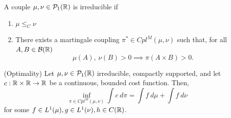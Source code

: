 \documentclass[../main.tex]{subfiles}
\begin{document}
\begin{definition}
    A couple $\mu, \nu\in\mathcal{P}_1(\mathbb{R})$ is irreducible if 
    \begin{enumerate}
        \item $\mu\leq_C\nu$
        \item There exists a martingale coupling $\pi^*\in Cpl^M(\mu, \nu)$ such that, for all $A, B\in\mathcal{B}(\mathbb{R})$ 
        $$\mu(A), \ \nu(B)>0 \implies \pi(A\times B)>0.$$
    \end{enumerate}
\end{definition}

\begin{theorem} (Optimality)
    Let $\mu, \nu\in\mathcal{P}_1(\mathbb{R})$ irreducible, compactly supported, and let $c: \mathbb{R}\times \mathbb{R}\to \mathbb{R}$ be a continuous, bounded cost function. Then, 
    $$
    \inf_{\pi\in Cpl^M(\mu, \nu)} \int c \ d\pi = \int f \ d \mu + \int f \ d\nu
    $$
    for some $f\in L^1(\mu), g\in L^1(\nu), h\in C(\mathbb{R})$.
\end{theorem}
\end{document}
